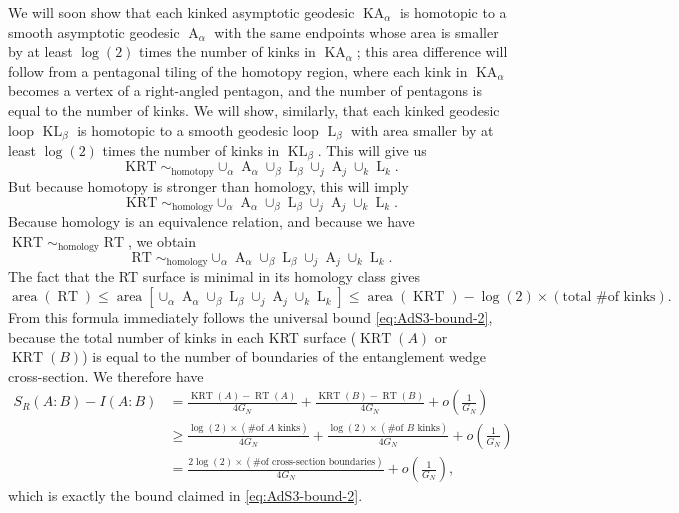 \documentclass[a4paper,11pt]{article}
\newcommand{\area}{\operatorname{area}}
\newcommand{\RT}{\operatorname{RT}}
\newcommand{\KRT}{\operatorname{KRT}}
\newcommand{\KA}{\operatorname{KA}}
\newcommand{\KL}{\operatorname{KL}}
\newcommand{\A}{\operatorname{A}}
\renewcommand{\L}{\operatorname{L}}
\begin{document}
We will soon show that each kinked asymptotic geodesic $\KA_{\alpha}$ is homotopic to a smooth asymptotic geodesic $\A_{\alpha}$ with the same endpoints whose area is smaller by at least $\log(2)$ times the number of kinks in $\KA_{\alpha}$; this area difference will follow from a pentagonal tiling of the homotopy region, where each kink in $\KA_{\alpha}$ becomes a vertex of a right-angled pentagon, and the number of pentagons is equal to the number of kinks. We will show, similarly, that each kinked geodesic loop $\KL_{\beta}$ is homotopic to a smooth geodesic loop $\L_{\beta}$ with area smaller by at least $\log(2)$ times the number of kinks in $\KL_{\beta}.$ This will give us
\begin{equation}
    \KRT \sim_{\text{homotopy}} \cup_{\alpha} \A_{\alpha} \cup_{\beta} \L_{\beta} \cup_{j} \A_{j} \cup_{k} \L_{k}.
\end{equation}
But because homotopy is stronger than homology, this will imply
\begin{equation}
    \KRT \sim_{\text{homology}} \cup_{\alpha} \A_{\alpha} \cup_{\beta} \L_{\beta} \cup_{j} \A_{j} \cup_{k} \L_{k}.
\end{equation}
Because homology is an equivalence relation, and because we have $\KRT \sim_{\text{homology}} \RT$, we obtain
\begin{equation}
    \RT \sim_{\text{homology}} \cup_{\alpha} \A_{\alpha} \cup_{\beta} \L_{\beta} \cup_{j} \A_{j} \cup_{k} \L_{k}.
\end{equation}
The fact that the RT surface is minimal in its homology class gives
\begin{equation}
    \area(\RT) \leq \area\left[ \cup_{\alpha} \A_{\alpha} \cup_{\beta} \L_{\beta} \cup_{j} \A_{j} \cup_{k} \L_{k} \right]
    \leq \area(\KRT) - \log(2) \times (\text{total \# of kinks}).
\end{equation}
From this formula immediately follows the universal bound \eqref{eq:AdS3-bound-2}, because the total number of kinks in each KRT surface ($\KRT(A)$ or $\KRT(B)$) is equal to the number of boundaries of the entanglement wedge cross-section. We therefore have
\begin{align}
    S_R(A:B) - I(A:B)
        & = \frac{\KRT(A) - \RT(A)}{4 G_N} + \frac{\KRT(B) - \RT(B)}{4 G_N} + o\left(\frac{1}{G_N}\right) \nonumber \\
        & \geq \frac{\log(2) \times (\text{\# of $A$ kinks})}{4 G_N} + \frac{\log(2) \times (\text{\# of $B$ kinks})}{4 G_N} + o\left(\frac{1}{G_N}\right) \nonumber \\
        & = \frac{2 \log(2) \times (\text{\# of cross-section boundaries})}{4 G_N} + o\left(\frac{1}{G_N}\right),
\end{align}
which is exactly the bound claimed in \eqref{eq:AdS3-bound-2}.
\end{document}
